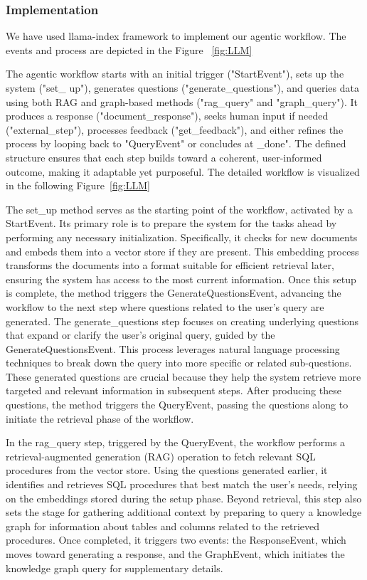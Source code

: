 \documentclass[11pt]{article}
\begin{document}
\subsubsection{Implementation}

We have used llama-index framework to implement our agentic workflow. The events and process are depicted in the Figure ~\ref{fig:LLM}

The agentic workflow starts with an initial trigger ("StartEvent"), sets up the system ("set\_ up"), generates questions ("generate\_questions"), and queries data using both RAG and graph-based methods ("rag\_query" and "graph\_query"). It produces a response ("document\_response"), seeks human input if needed ("external\_step"), processes feedback ("get\_feedback"), and either refines the process by looping back to "QueryEvent" or concludes at \_done". The defined structure ensures that each step builds toward a coherent, user-informed outcome, making it adaptable yet purposeful. The detailed workflow is visualized in the following Figure~\ref{fig:LLM}

The set\_up method serves as the starting point of the workflow, activated by a StartEvent. Its primary role is to prepare the system for the tasks ahead by performing any necessary initialization. Specifically, it checks for new documents and embeds them into a vector store if they are present. This embedding process transforms the documents into a format suitable for efficient retrieval later, ensuring the system has access to the most current information. Once this setup is complete, the method triggers the GenerateQuestionsEvent, advancing the workflow to the next step where questions related to the user’s query are generated. The generate\_questions step focuses on creating underlying questions that expand or clarify the user’s original query, guided by the GenerateQuestionsEvent. This process leverages natural language processing techniques to break down the query into more specific or related sub-questions. These generated questions are crucial because they help the system retrieve more targeted and relevant information in subsequent steps. After producing these questions, the method triggers the QueryEvent, passing the questions along to initiate the retrieval phase of the workflow.

In the rag\_query step, triggered by the QueryEvent, the workflow performs a retrieval-augmented generation (RAG) operation to fetch relevant SQL procedures from the vector store. Using the questions generated earlier, it identifies and retrieves SQL procedures that best match the user’s needs, relying on the embeddings stored during the setup phase. Beyond retrieval, this step also sets the stage for gathering additional context by preparing to query a knowledge graph for information about tables and columns related to the retrieved procedures. Once completed, it triggers two events: the ResponseEvent, which moves toward generating a response, and the GraphEvent, which initiates the knowledge graph query for supplementary details.
\end{document}
